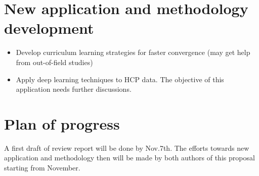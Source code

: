 \documentclass[11pt]{article}
\numberwithin{equation}{section}
\numberwithin{equation}{section}
\newcommand{\0}{{\mathbf{0}}}
\newcommand{\1}{{\mathbf{1}}}
\begin{document}
\section{New application and methodology development}
\begin{itemize}
\item Develop curriculum learning strategies for faster convergence (may get help from out-of-field studies)
\item Apply deep learning techniques to HCP data. The objective of this application needs further discussions.
\end{itemize}



\section{ Plan of progress }
A first draft of review report will be done by Nov.7th. The efforts towards new application and methodology then will be made by both authors of this proposal starting from November.
\end{document}
